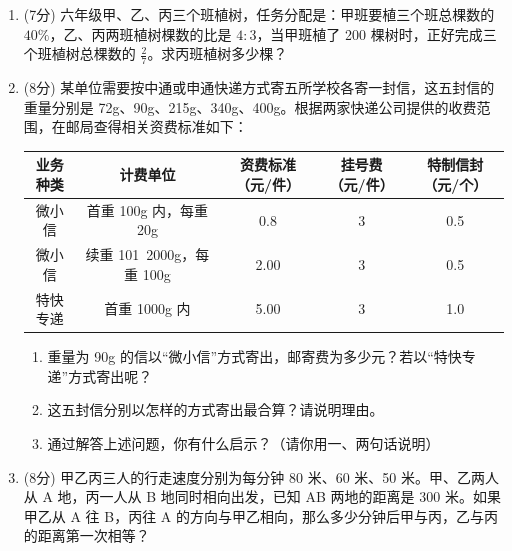 \documentclass[11pt,a4paper]{ctexart}
\begin{document}
\begin{enumerate}
    \item[12.] (7分) 六年级甲、乙、丙三个班植树，任务分配是：甲班要植三个班总棵数的 $40\%$，乙、丙两班植树棵数的比是 $4:3$，当甲班植了 200 棵树时，正好完成三个班植树总棵数的 $\frac{2}{7}$。求丙班植树多少棵？
    \vspace{3.5cm}

    \item[13.] (8分) 某单位需要按中通或申通快递方式寄五所学校各寄一封信，这五封信的重量分别是 72g、90g、215g、340g、400g。根据两家快递公司提供的收费范围，在邮局查得相关资费标准如下：
    
    \begin{table}[htbp]
        \centering
        \begin{tabular}{|c|c|c|c|c|}
            \hline
            业务种类 & 计费单位 & 资费标准（元/件） & 挂号费（元/件） & 特制信封（元/个） \\
            \hline
            微小信 & 首重 100g 内，每重 20g & 0.8 & 3 & 0.5 \\
            \hline
            微小信 & 续重 101~2000g，每重 100g & 2.00 & 3 & 0.5 \\
            \hline
            特快专递 & 首重 1000g 内 & 5.00 & 3 & 1.0 \\
            \hline
        \end{tabular}
    \end{table}
    
    \begin{enumerate}
        \item[(1)] 重量为 90g 的信以“微小信”方式寄出，邮寄费为多少元？若以“特快专递”方式寄出呢？
        \vspace{2.5cm}
        \item[(2)] 这五封信分别以怎样的方式寄出最合算？请说明理由。
        \vspace{2.5cm}
        \item[(3)] 通过解答上述问题，你有什么启示？（请你用一、两句话说明）
        \vspace{2.5cm}
    \end{enumerate}

    \item[14.] (8分) 甲乙丙三人的行走速度分别为每分钟 80 米、60 米、50 米。甲、乙两人从 A 地，丙一人从 B 地同时相向出发，已知 AB 两地的距离是 300 米。如果甲乙从 A 往 B，丙往 A 的方向与甲乙相向，那么多少分钟后甲与丙，乙与丙的距离第一次相等？
    \vspace{3.5cm}
    

\end{enumerate}
\end{document}
